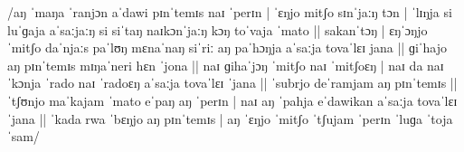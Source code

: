 \documentclass[12pt,paper=a4]{scrartcl}
\begin{document}
\begin{sloppypar}
\noindent /aŋ ˈmaŋa ˈranjɔn aˈdawi pɪnˈtemɪs naɪ ˈperɪn | ˈɛŋjo mitʃo sɪnˈjaːŋ tɔn | ˈlɪŋja si luˈɡaja aˈsaːjaːŋ si siˈtaŋ naɪkɔnˈjaːŋ kɔŋ toˈvaja ˈmato ||
sakanˈtɔŋ | ɛŋˈɔŋjo ˈmitʃo daˈnjaːs paˈlʊŋ mɛnaˈnaŋ siˈriː aŋ paˈhɔŋja aˈsaːja tovaˈlɛɪ jana ||
ɡiˈhajo aŋ pɪnˈtemɪs mɪŋaˈneri hɛn ˈjona ||
naɪ ɡihaˈjɔŋ ˈmitʃo naɪ ˈmitʃoɛŋ | naɪ da naɪˈkɔnja ˈrado naɪ ˈradoɛŋ aˈsaːja tovaˈlɛɪ ˈjana ||
ˈsubrjo deˈramjam aŋ pɪnˈtemɪs ||
ˈtʃʊnjo maˈkajam ˈmato eˈpaŋ aŋ ˈperɪn | naɪ aŋ ˈpahja eˈdawikan aˈsaːja tovaˈlɛɪ ˈjana ||
ˈkada rwa ˈbɛŋjo aŋ pɪnˈtemɪs | aŋ ˈɛŋjo ˈmitʃo ˈtʃujam ˈperɪn ˈluɡa ˈtoja ˈsam/
\end{sloppypar}



\begin{multicols}{3}
\printglossary[style=mysuper,type=\leipzigtype]
\end{multicols}

\printbibliography[heading=bibintoc]
\end{document}
